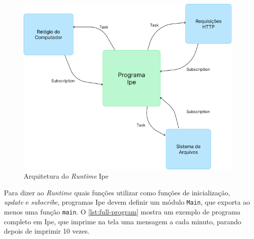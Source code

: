 \begin{figure}[htb]
    \caption{Arquitetura do \textit{Runtime} Ipe}
    \label{fig:runtime}
    \begin{center}
        \includegraphics[scale=0.65]{pictures/runtime.png}
    \end{center}
\end{figure}

Para dizer ao \textit{Runtime} quais funções utilizar como funções de inicialização,
\textit{update} e \textit{subscribe}, programas Ipe devem definir um módulo \texttt{Main},
que exporta ao menos uma função \texttt{main}. O \autoref{lst:full-program} mostra
um exemplo de programa completo em Ipe, que imprime na tela uma mensagem a cada
minuto, parando depois de imprimir 10 vezes.

